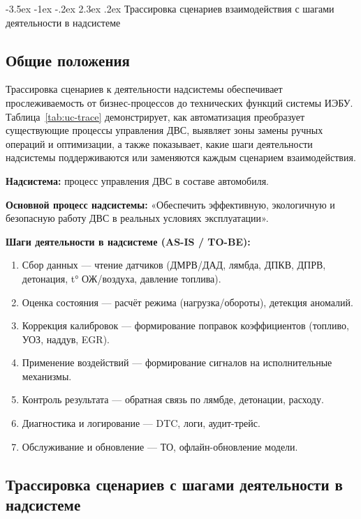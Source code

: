 \documentclass[14pt, a4paper]{extarticle}
\makeatletter
\renewcommand\section{\clearpage\@startsection{section}{1}{1.25cm}%
	{-3.5ex \@plus -1ex \@minus -.2ex}%
	{2.3ex \@plus.2ex}%
	{%
		\bfseries
		\fontsize{16}{1.5}\selectfont
}}
\makeatother
\begin{document}
				\section{Трассировка сценариев взаимодействия с шагами деятельности в надсистеме}
				
				\subsection{Общие положения}
				
				Трассировка сценариев к деятельности надсистемы обеспечивает прослеживаемость от бизнес-процессов до технических функций системы ИЭБУ. Таблица~\ref{tab:uc-trace} демонстрирует, как автоматизация преобразует существующие процессы управления ДВС, выявляет зоны замены ручных операций и оптимизации, а также показывает, какие шаги деятельности надсистемы поддерживаются или заменяются каждым сценарием взаимодействия.
				
				\textbf{Надсистема:} процесс управления ДВС в составе автомобиля.
				
				\textbf{Основной процесс надсистемы:} «Обеспечить эффективную, экологичную и безопасную работу ДВС в реальных условиях эксплуатации».
				
				\textbf{Шаги деятельности в надсистеме (AS-IS / TO-BE):}
				\begin{enumerate}
					\item Сбор данных — чтение датчиков (ДМРВ/ДАД, лямбда, ДПКВ, ДПРВ, детонация, t° ОЖ/воздуха, давление топлива).
					\item Оценка состояния — расчёт режима (нагрузка/обороты), детекция аномалий.
					\item Коррекция калибровок — формирование поправок коэффициентов (топливо, УОЗ, наддув, EGR).
					\item Применение воздействий — формирование сигналов на исполнительные механизмы.
					\item Контроль результата — обратная связь по лямбде, детонации, расходу.
					\item Диагностика и логирование — DTC, логи, аудит-трейс.
					\item Обслуживание и обновление — ТО, офлайн-обновление модели.
				\end{enumerate}
				
				\subsection{Трассировка сценариев с шагами деятельности в надсистеме}
				
\end{document}
